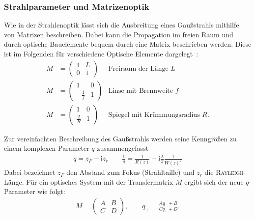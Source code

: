 \documentclass[a4paper,twoside,final]{article}
\begin{document}
\subsubsection{Strahlparameter und Matrizenoptik}
Wie in der Strahlenoptik lässt sich die Ausbreitung eines Gaußstrahls mithilfe von Matrizen beschreiben. Dabei kann die Propagation im freien Raum und durch optische Bauelemente bequem durch eine Matrix beschrieben werden. Diese ist im Folgenden für verschiedene Optische Elemente dargelegt~\cite{Peschel}:
\begin{align}
  M &= \begin{pmatrix}
    1 & L \\ 0 & 1
\end{pmatrix} & \text{Freiraum der Länge }L \label{eqn:Matrix_Freiraum}\\
  M &= \begin{pmatrix}
  1 & 0 \\ -\frac{1}{f} & 1
\end{pmatrix} & \text{Linse mit Brennweite }f \label{eqn:Matrix_Linse}\\
  M &= \begin{pmatrix}
  1 & 0 \\ \frac{2}{R} & 1
\end{pmatrix} & \text{Spiegel mit Krümmungsradius }R.
\end{align}

Zur vereinfachten Beschreibung des Gaußstrahls werden seine Kenngrößen zu einem komplexen Parameter $q$ zusammengefasst
\begin{align}\label{eqn:q-Parameter}
  q = z_F - \mathrm{i} z_r \qquad \frac{1}{q} = \frac{1}{R(z)} + \mathrm{i}\frac{\lambda}{\pi}\frac{1}{W(z)^2}
\end{align}
Dabei bezeichnet $z_F$ den Abstand zum Fokus (Strahltaille) und $z_r$ die \textsc{Rayleigh}-Länge. Für ein optisches System mit der Transfermatrix $M$ ergibt sich der neue $q$-Parameter wie folgt:
\begin{align}\label{eqn:Transfermatrix}
  M = \begin{pmatrix}
    A & B \\ C & D
\end{pmatrix}, \qquad q_+ = \frac{A q_- + B}{C q_- + D}.
\end{align}
\end{document}
